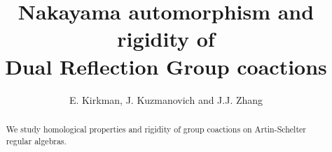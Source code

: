 
\usepackage{latexsym,amsxtra,amscd,ifthen}
\usepackage{amsfonts}
\usepackage{verbatim}
\usepackage{amsmath}
\usepackage{amsthm}
\usepackage{amssymb}

\theoremstyle{plain}
\newtheorem{theorem}{Theorem}[section]
\newtheorem{lemma}[theorem]{Lemma}
\newtheorem{proposition}[theorem]{Proposition}
\newtheorem{corollary}[theorem]{Corollary}
\newtheorem{conjecture}[theorem]{Conjecture}

\theoremstyle{definition}
\newtheorem{definition}[theorem]{Definition}
\newtheorem{example}[theorem]{Example}
\newtheorem{convention}[theorem]{Convention}
\newtheorem{remark}[theorem]{Remark}
\newtheorem{question}[theorem]{Question}

\makeatletter              
\let\c@equation\c@theorem  
                            
\makeatother

 
 
 

 

 
 
 
 

 
 
 
 

 
 
 

 
 

 
 

 

 


\title[Dual Reflection Groups]
{Nakayama automorphism and rigidity of\\
Dual Reflection Group coactions}

\author{E. Kirkman, J. Kuzmanovich and J.J. Zhang}

\address{Kirkman: Department of Mathematics,
P. O. Box 7388, Wake Forest University, Winston-Salem, NC 27109}


\address{Kuzmanovich: Department of Mathematics,
P. O. Box 7388, Wake Forest University, Winston-Salem, NC 27109}


\address{Zhang: Department of Mathematics, Box 354350,
University of Washington, Seattle, Washington 98195, USA}


\begin{abstract}
We study homological properties and rigidity of
group coactions on Artin-Schelter regular algebras.
\end{abstract}

